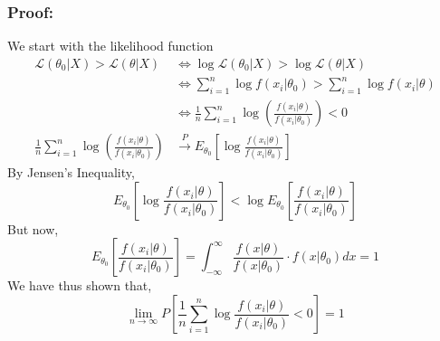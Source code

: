 \documentclass{article}
\begin{document}
\subsubsection*{Proof:}
We start with the likelihood function
\begin{equation*}
\begin{split}
    \mathcal{L}(\theta_0|X) > \mathcal{L}(\theta|X) &\iff \log \mathcal{L}(\theta_0|X) > \log \mathcal{L}(\theta|X)\\
    &\iff \sum_{i=1}^n \log f(x_i|\theta_0) > \sum_{i=1}^n \log f(x_i|\theta)\\
    &\iff \frac{1}{n} \sum_{i=1}^n \log \left(\frac{f(x_i|\theta)}{f(x_i|\theta_0)} \right) < 0\\
    \frac{1}{n}\sum_{i=1}^n \log \left(\frac{f(x_i|\theta)}{f(x_i|\theta_0)} \right) &\xrightarrow{P} E_{\theta_0}\left[\log \frac{f(x_i|\theta)}{f(x_i|\theta_0)} \right]
\end{split}
\end{equation*}
By Jensen's Inequality,
\begin{equation*}
    E_{\theta_0}\left[\log \frac{f(x_i|\theta)}{f(x_i|\theta_0)} \right] < \log E_{\theta_0}\left[ \frac{f(x_i|\theta)}{f(x_i|\theta_0)} \right]
\end{equation*}
But now,
\begin{equation*}
    E_{\theta_0}\left[ \frac{f(x_i|\theta)}{f(x_i|\theta_0)} \right] = \int_{-\infty}^\infty \frac{f(x|\theta)}{f(x|\theta_0)}\cdot f(x|\theta_0) dx = 1 
\end{equation*}
We have thus shown that,
\begin{equation*}
    \lim_{n\to\infty} P\left[ \frac{1}{n} \sum_{i=1}^n \log \frac{f(x_i|\theta)}{f(x_i|\theta_0)} < 0 \right] = 1
\end{equation*}
\end{document}
